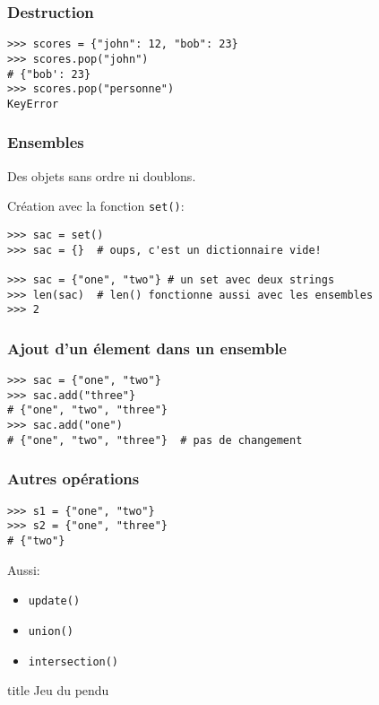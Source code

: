 \documentclass{beamer}
\begin{document}
\begin{frame}[fragile]
  \frametitle{Destruction}

\begin{lstlisting}
>>> scores = {"john": 12, "bob": 23}
>>> scores.pop("john")
# {"bob': 23}
>>> scores.pop("personne")
KeyError
\end{lstlisting}

\end{frame}

\begin{frame}[fragile]
  \frametitle{Ensembles}
Des objets sans ordre ni doublons.

Création avec la fonction \texttt{set()}:

\begin{lstlisting}
>>> sac = set()
>>> sac = {}  # oups, c'est un dictionnaire vide!

>>> sac = {"one", "two"} # un set avec deux strings
>>> len(sac)  # len() fonctionne aussi avec les ensembles
>>> 2
\end{lstlisting}
\end{frame}

\begin{frame}[fragile]
  \frametitle{Ajout d'un élement dans un ensemble}
\begin{lstlisting}
>>> sac = {"one", "two"}
>>> sac.add("three"}
# {"one", "two", "three"}
>>> sac.add("one")
# {"one", "two", "three"}  # pas de changement
\end{lstlisting}
\end{frame}

\begin{frame}[fragile]
  \frametitle{Autres opérations}
\begin{lstlisting}
>>> s1 = {"one", "two"}
>>> s2 = {"one", "three"}
# {"two"}
\end{lstlisting}

Aussi:

\begin{itemize}
  \item \texttt{update()}
  \item \texttt{union()}
  \item \texttt{intersection()}
\end{itemize}
\end{frame}

\begin{frame}[fragile]

  \begin{beamercolorbox}[sep=8pt,center,shadow=true,rounded=true]{title}
    Jeu du pendu
  \end{beamercolorbox}

\end{frame}
\end{document}
